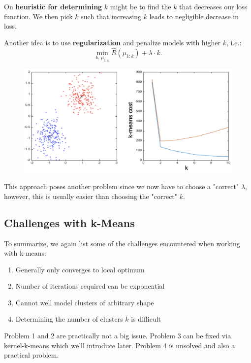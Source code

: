 \documentclass[a4paper]{extarticle}
\begin{document}
On \textbf{heuristic for determining} $k$ might be to find the $k$ that decreases our loss function. We then pick $k$ such that increasing $k$ leads to negligible decrease in loss.

Another idea is to use \textbf{regularization} and penalize models with higher $k$, i.e.:
\[
    \min_{k, \, \mu_{1:k}} \hat{R}(\mu_{1:k}) + \lambda \cdot k.
\]

\begin{figure}[H]
    \includegraphics[width=15cm]{../images/IntroML_Fig8-7}
    \centering
\end{figure}

This approach poses another problem since we now have to choose a "correct" $\lambda$, however, this is usually easier than choosing the "correct" $k$.

\subsection{Challenges with k-Means}

To summarize, we again list some of the challenges encountered when working with k-means:
\begin{enumerate}
    \item Generally only converges to local optimum
    \item Number of iterations required can be exponential
    \item Cannot well model clusters of arbitrary shape
    \item Determining the number of clusters $k$ is difficult
\end{enumerate}

Problem 1 and 2 are practically not a big issue. Problem 3 can be fixed via kernel-k-means which we'll introduce later. Problem 4 is unsolved and also a practical problem.
\end{document}

